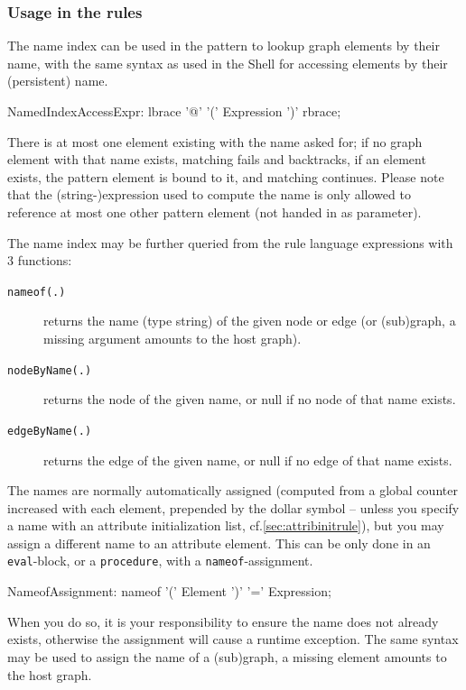 \subsubsection*{Usage in the rules}
The name index can be used in the pattern to lookup graph elements by their name, with the same syntax as used in the Shell for accessing elements by their (persistent) name.

\begin{rail}
  NamedIndexAccessExpr:
    lbrace '@' '(' Expression ')' rbrace;
\end{rail}

There is at most one element existing with the name asked for; if no graph element with that name exists, matching fails and backtracks, if an element exists, the pattern element is bound to it, and matching continues.
Please note that the (string-)expression used to compute the name is only allowed to reference at most one other pattern element (not handed in as parameter).

The name index may be further queried from the rule language expressions with 3 functions:
\begin{description}
\item[\texttt{nameof(.)}] returns the name (type string) of the given node or edge (or (sub)graph, a missing argument amounts to the host graph).
\item[\texttt{nodeByName(.)}] returns the node of the given name, or null if no node of that name exists.
\item[\texttt{edgeByName(.)}] returns the edge of the given name, or null if no edge of that name exists.
\end{description}

The names are normally automatically assigned (computed from a global counter increased with each element, prepended by the dollar symbol -- unless you specify a name with an attribute initialization list, cf.\ref{sec:attribinitrule}), but you may assign a different name to an attribute element.
This can be only done in an \texttt{eval}-block, or a \texttt{procedure}, with a \texttt{nameof}-assignment.

\begin{rail}
  NameofAssignment:
    nameof '(' Element ')' '=' Expression;
\end{rail}

When you do so, it is your responsibility to ensure the name does not already exists, otherwise the assignment will cause a runtime exception.
The same syntax may be used to assign the name of a (sub)graph, a missing element amounts to the host graph.

